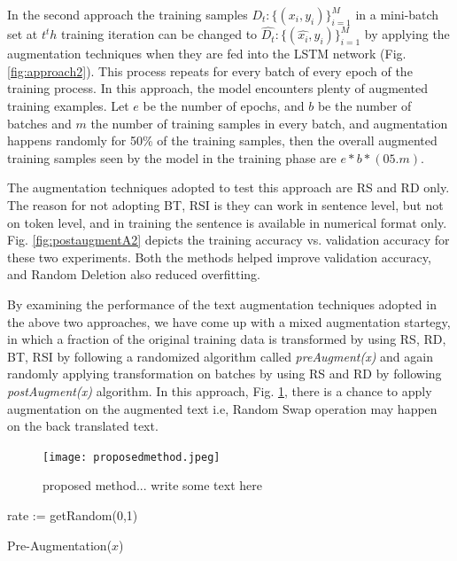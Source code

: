 \documentclass{article}
\begin{document}
In the second approach the training samples $D_t : \{(x_i, y_i)\}_{i=1}^M$ in a mini-batch set at $t^th$ training iteration can be changed to $\hat{D_t} : \{(\hat{x_i}, y_i)\}_{i=1}^M$ by applying the augmentation techniques when they are fed into the LSTM network (Fig. \ref{fig:approach2}). This process repeats for every batch of every epoch of the training process. In this approach, the model encounters plenty of augmented training examples. 
Let $e$ be the number of epochs, and $b$ be the number of batches and $m$ the number of training samples in every batch, and augmentation happens randomly for 50\% of the training samples, then the overall augmented training samples seen by the model in the training phase are $e * b * (05.m)$.

The augmentation techniques adopted to test this approach are RS and RD only. The reason for not adopting BT, RSI is they can work in sentence level, but not on token level, and in training the sentence is available in numerical format only. Fig. \ref{fig:postaugmentA2} depicts the training accuracy vs. validation accuracy for these two experiments. Both the methods helped improve validation accuracy, and Random Deletion also reduced overfitting.


By examining the performance of the text augmentation techniques adopted in the above two approaches, we have come up with a mixed augmentation startegy, in which a fraction of the original training data is transformed by using RS, RD, BT, RSI by following a randomized algorithm called \textit{preAugment(x)} and again randomly applying transformation on batches by using RS and RD by following \textit{postAugment(x)} algorithm. In this approach, Fig. \ref{fig:proposedapproach}, there is a chance to apply augmentation on the augmented text i.e, Random Swap operation may happen on the back translated text.

\begin{figure}[h!]
\centering
  \texttt{[image: proposedmethod.jpeg]}
  \caption{proposed method... write some text here}
  \label{fig:proposedapproach}
\end{figure}

\begin{algorithm}[H]
\SetAlgoLined
{}
rate := getRandom(0,1) 
\caption{Pre-Augmentation($x$)}
\end{algorithm}
\end{document}
